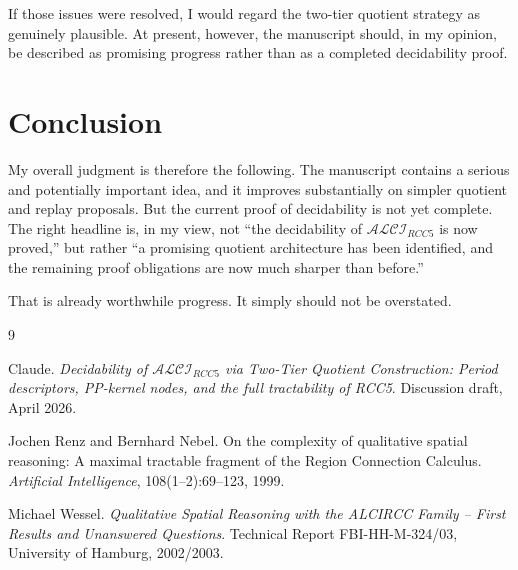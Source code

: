 \documentclass[11pt]{article}
\begin{document}
If those issues were resolved, I would regard the two-tier quotient strategy as genuinely plausible. At present, however, the manuscript should, in my opinion, be described as promising progress rather than as a completed decidability proof.

\section{Conclusion}

My overall judgment is therefore the following. The manuscript contains a serious and potentially important idea, and it improves substantially on simpler quotient and replay proposals. But the current proof of decidability is not yet complete. The right headline is, in my view, not ``the decidability of $\mathcal{ALCI}_{RCC5}$ is now proved,'' but rather ``a promising quotient architecture has been identified, and the remaining proof obligations are now much sharper than before.''

That is already worthwhile progress. It simply should not be overstated.

\begin{thebibliography}{9}

Claude.
\newblock \emph{Decidability of $\mathcal{ALCI}_{RCC5}$ via Two-Tier Quotient Construction: Period descriptors, PP-kernel nodes, and the full tractability of RCC5}.
\newblock Discussion draft, April 2026.

Jochen Renz and Bernhard Nebel.
\newblock On the complexity of qualitative spatial reasoning: A maximal tractable fragment of the Region Connection Calculus.
\newblock \emph{Artificial Intelligence}, 108(1--2):69--123, 1999.

Michael Wessel.
\newblock \emph{Qualitative Spatial Reasoning with the ALCIRCC Family -- First Results and Unanswered Questions}.
\newblock Technical Report FBI-HH-M-324/03, University of Hamburg, 2002/2003.

\end{thebibliography}
\end{document}
